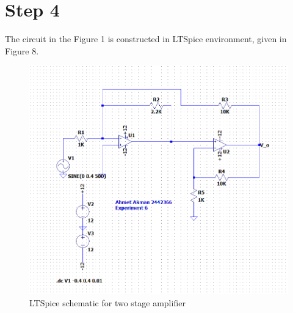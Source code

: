 \documentclass[letterpaper,12pt]{article}
\begin{document}
\section{Step 4}
The circuit in the Figure 1 is constructed in LTSpice environment, given in Figure 8.
\begin{figure}[H]
	\centering
   \includegraphics[width=1\textwidth]{Pre1.png}
   \caption{LTSpice schematic for two stage amplifier}
\end{figure} 
\end{document}
